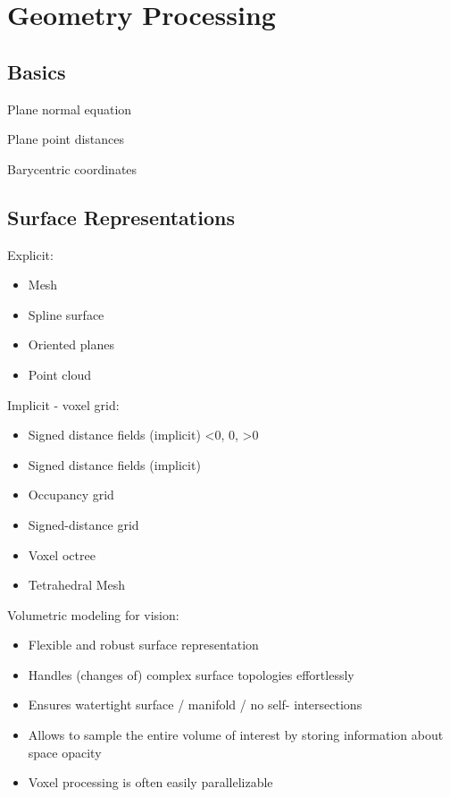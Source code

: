 \section{Geometry Processing} 

\subsection{Basics}

Plane normal equation

Plane point distances

Barycentric coordinates

\subsection{ Surface Representations}

Explicit:
\begin{itemize}
\item Mesh
\item Spline surface
\item Oriented planes
\item Point cloud
\end{itemize}

Implicit - voxel grid:
\begin{itemize}
\item Signed distance fields (implicit) <0, 0, >0
\item Signed distance fields (implicit)
\item Occupancy grid
\item Signed-distance grid
\item Voxel octree
\item Tetrahedral Mesh
\end{itemize}

Volumetric modeling for vision:
\begin{itemize}
\item Flexible and robust surface representation
\item Handles (changes of) complex surface topologies effortlessly
\item Ensures watertight surface / manifold / no self- intersections
\item Allows to sample the entire volume of interest by storing information about space opacity
\item Voxel processing is often easily parallelizable
\end{itemize}

